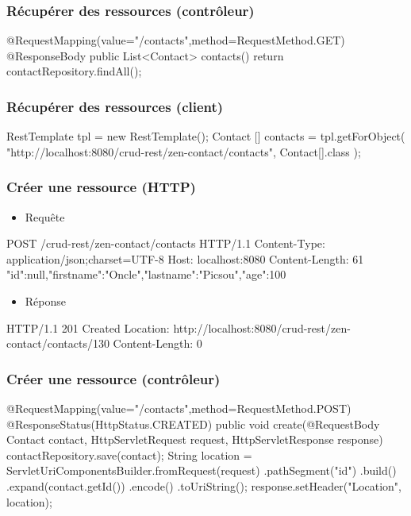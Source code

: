 \begin{frame}[fragile]
 \frametitle{Récupérer des ressources (contrôleur)}
 
 \begin{javacode}
@RequestMapping(value="/contacts",method=RequestMethod.GET)
@ResponseBody 
public List<Contact> contacts() {
  return contactRepository.findAll();
}
 \end{javacode}  

\end{frame}

\begin{frame}[fragile]
 \frametitle{Récupérer des ressources (client)}
 
 \begin{javacode}
RestTemplate tpl = new RestTemplate();
Contact [] contacts = tpl.getForObject(
  "http://localhost:8080/crud-rest/zen-contact/contacts", 
  Contact[].class
);
 \end{javacode}  

\end{frame}

\begin{frame}[fragile]
 \frametitle{Créer une ressource (HTTP)}
 
 \begin{itemize}
  \item Requête
 \end{itemize} 
 
 \begin{textcode}
POST /crud-rest/zen-contact/contacts HTTP/1.1
Content-Type: application/json;charset=UTF-8
Host: localhost:8080
Content-Length: 61
{"id":null,"firstname":"Oncle","lastname":"Picsou","age":100}
 \end{textcode}
 
  \begin{itemize}
  \item Réponse
 \end{itemize} 
 
 \begin{textcode}
HTTP/1.1 201 Created
Location: http://localhost:8080/crud-rest/zen-contact/contacts/130
Content-Length: 0
 \end{textcode}

\end{frame}

\begin{frame}[fragile]
 \frametitle{Créer une ressource (contrôleur)}
 
 \begin{javacode}
@RequestMapping(value="/contacts",method=RequestMethod.POST)
@ResponseStatus(HttpStatus.CREATED)
public void create(@RequestBody Contact contact,
                   HttpServletRequest request, 
                   HttpServletResponse response) {
  contactRepository.save(contact);
  String location = ServletUriComponentsBuilder.fromRequest(request)
    .pathSegment("{id}")
    .build()
    .expand(contact.getId())
    .encode()
    .toUriString();
  response.setHeader("Location", location);
}
 \end{javacode}  

\end{frame}

